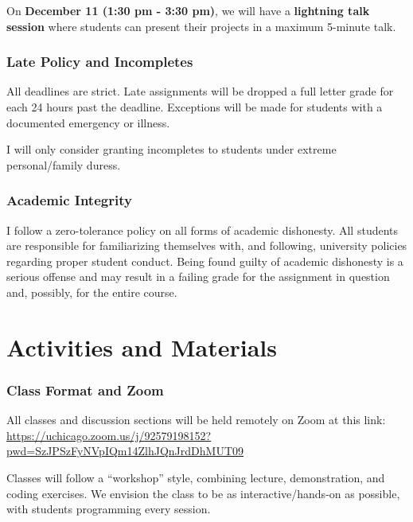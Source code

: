 \documentclass[]{book}
\begin{document}
On \textbf{December 11 (1:30 pm - 3:30 pm)}, we will have a
\textbf{lightning talk session} where students can present their
projects in a maximum 5-minute talk.

\subsubsection*{Late Policy and
Incompletes}\label{late-policy-and-incompletes}

All deadlines are strict. Late assignments will be dropped a full letter
grade for each 24 hours past the deadline. Exceptions will be made for
students with a documented emergency or illness.

I will only consider granting incompletes to students under extreme
personal/family duress.

\subsubsection*{Academic Integrity}\label{academic-integrity}

I follow a zero-tolerance policy on all forms of academic dishonesty.
All students are responsible for familiarizing themselves with, and
following, university policies regarding proper student conduct. Being
found guilty of academic dishonesty is a serious offense and may result
in a failing grade for the assignment in question and, possibly, for the
entire course.

\section{Activities and Materials}\label{activities-and-materials}

\subsubsection*{Class Format and Zoom}\label{class-format-and-zoom}

All classes and discussion sections will be held remotely on Zoom at
this link:
\url{https://uchicago.zoom.us/j/92579198152?pwd=SzJPSzFyNVpIQm14ZlhJQnJrdDhMUT09}

Classes will follow a ``workshop'' style, combining lecture,
demonstration, and coding exercises. We envision the class to be as
interactive/hands-on as possible, with students programming every
session.
\end{document}
